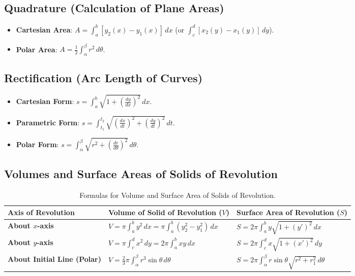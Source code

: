 \subsection{Quadrature (Calculation of Plane Areas)}
\begin{itemize}[leftmargin=1.5em]
    \item \textbf{Cartesian Area}: $A = \int_a^b [y_2(x) - y_1(x)]\,dx$ (or $\int_c^d [x_2(y) - x_1(y)]\,dy$).
    \item \textbf{Polar Area}: $A = \frac{1}{2} \int_{\alpha}^\beta r^2\,d\theta$.
\end{itemize}

\subsection{Rectification (Arc Length of Curves)}
\begin{itemize}[leftmargin=1.5em]
    \item \textbf{Cartesian Form}: $s = \int_a^b \sqrt{1 + \left(\frac{dy}{dx}\right)^2}\,dx$.
    \item \textbf{Parametric Form}: $s = \int_{t_1}^{t_2} \sqrt{\left(\frac{dx}{dt}\right)^2 + \left(\frac{dy}{dt}\right)^2}\,dt$.
    \item \textbf{Polar Form}: $s = \int_{\alpha}^\beta \sqrt{r^2 + \left(\frac{dr}{d\theta}\right)^2}\,d\theta$.
\end{itemize}

\subsection{Volumes and Surface Areas of Solids of Revolution}
\begin{table}[htbp]
\centering
\small
\renewcommand{\arraystretch}{1.3}
\begin{tabularx}{\linewidth}{l>{\raggedright\arraybackslash}X>{\raggedright\arraybackslash}X}
\toprule
\textbf{Axis of Revolution} & \textbf{Volume of Solid of Revolution ($V$)} & \textbf{Surface Area of Revolution ($S$)} \\
\midrule
\textbf{About $x$-axis} & $V = \pi \int_a^b y^2\,dx = \pi \int_a^b (y_2^2 - y_1^2)\,dx$ & $S = 2\pi \int_a^b y \sqrt{1 + (y')^2}\,dx$ \\
\textbf{About $y$-axis} & $V = \pi \int_c^d x^2\,dy = 2\pi \int_a^b x y\,dx$ & $S = 2\pi \int_c^d x \sqrt{1 + (x')^2}\,dy$ \\
\textbf{About Initial Line (Polar)} & $V = \frac{2}{3}\pi \int_\alpha^\beta r^3 \sin\theta\,d\theta$ & $S = 2\pi \int_\alpha^\beta r \sin\theta \sqrt{r^2 + r_1^2}\,d\theta$ \\
\bottomrule
\end{tabularx}
\caption{Formulas for Volume and Surface Area of Solids of Revolution.}
\label{tab:revolution-formulas}
\end{table}

